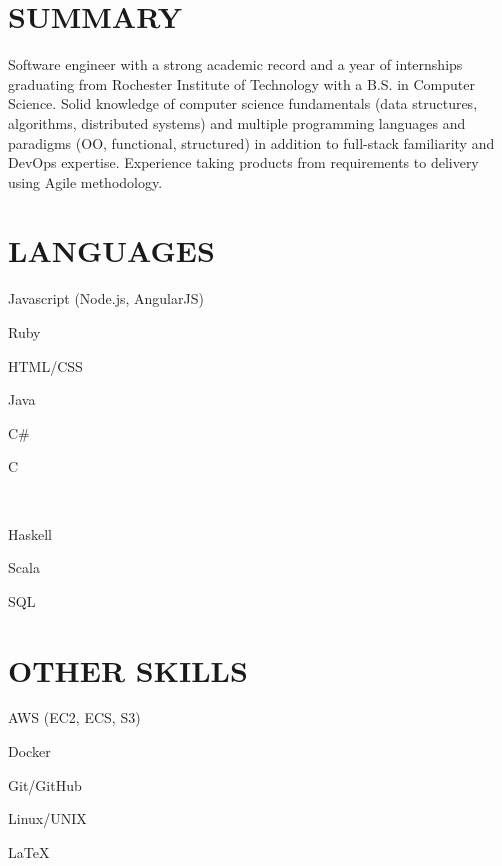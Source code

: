 \documentclass[margin]{res}
\begin{document}
  \address{  }
  \address{  }


  \begin{resume}

    \section{SUMMARY}
      \setlength{\parindent}{2ex}
        Software engineer with a strong academic record and a year of internships graduating from Rochester Institute of Technology with a B.S. in Computer Science. Solid knowledge of computer science fundamentals (data structures, algorithms, distributed systems) and multiple programming languages and paradigms (OO, functional, structured) in addition to full-stack familiarity and DevOps expertise. Experience taking products from requirements to delivery using Agile methodology.
      \setlength{\parindent}{0pt}

      \section{LANGUAGES}
        \begin{itemize*}[itemjoin=\hspace{2ex}]
          \item Javascript (Node.js, AngularJS)
          \item Ruby
          \item HTML/CSS
          \item Java
          \item C\#
          \item C
        \end{itemize*} \\
        \begin{itemize*}[itemjoin=\hspace{2ex}]
          \item Haskell
          \item Scala
          \item SQL
        \end{itemize*}


      \section{OTHER SKILLS}
        \begin{itemize*}[itemjoin=\hspace{2ex}]
          \item AWS (EC2, ECS, S3)
          \item Docker
          \item Git/GitHub
          \item Linux/UNIX
          \item \LaTeX
        \end{itemize*}


\end{resume}
\end{document}

